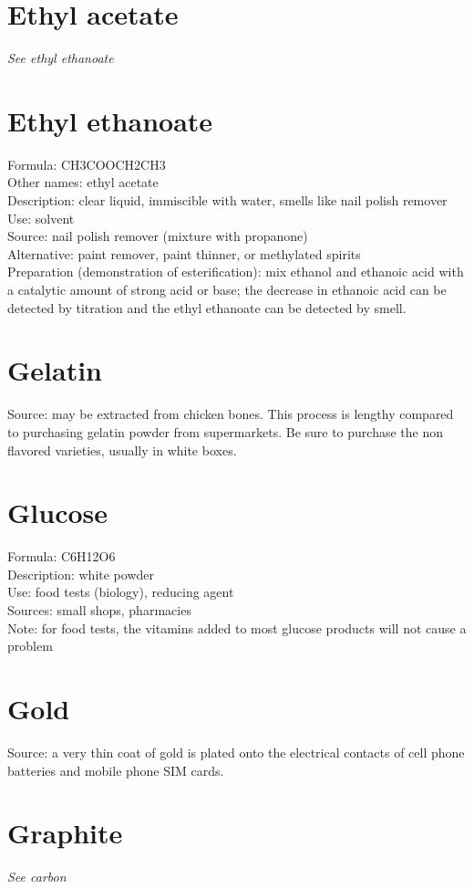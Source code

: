 \section{Ethyl acetate}
\textit{See ethyl ethanoate}

\section{Ethyl ethanoate}
Formula: CH3COOCH2CH3\\
Other names: ethyl acetate\\
Description: clear liquid, 
immiscible with water, 
smells like nail polish remover\\
Use: solvent\\
Source: nail polish remover (mixture with propanone)\\
Alternative: paint remover, 
paint thinner, 
or methylated spirits\\
Preparation (demonstration of esterification): 
mix ethanol and ethanoic acid 
with a catalytic amount of strong acid or base; 
the decrease in ethanoic acid can be detected 
by titration and the ethyl ethanoate can be detected by smell.

\section{Gelatin}
Source: may be extracted from chicken bones. 
This process is lengthy compared 
to purchasing gelatin powder from supermarkets. 
Be sure to purchase the non flavored varieties, 
usually in white boxes.

\section{Glucose}
Formula: C6H12O6\\
Description: white powder\\
Use: food tests (biology), 
reducing agent\\
Sources: small shops, 
pharmacies\\
Note: for food tests, 
the vitamins added to most glucose products will not cause a problem

\section{Gold}
Source: a very thin coat of gold is plated 
onto the electrical contacts of cell phone batteries 
and mobile phone SIM cards.

\section{Graphite}
\textit{See carbon}


